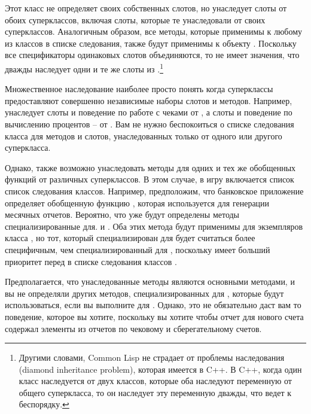 Этот класс не определяет своих собственных слотов, но унаследует слоты от обоих
суперклассов, включая слоты, которые те унаследовали от своих суперклассов.  Аналогичным
образом, все методы, которые применимы к любому из классов в списке следования, также
будут применимы к объекту .  Поскольку все спецификаторы
одинаковых слотов объединяются, то не имеет значения, что 
дважды наследует одни и те же слоты из .\footnote{Другими словами,
  Common Lisp не страдает от проблемы наследования (diamond inheritance problem), которая
  имеется в C++.  В C++, когда один класс наследуется от двух классов, которые оба
  наследуют переменную от общего суперкласса, то он наследует эту переменную дважды, что
  ведет к беспорядку.}

Множественное наследование наиболее просто понять когда суперклассы предоставляют
совершенно независимые наборы слотов и методов.  Например, 
унаследует слоты и поведение по работе с чеками от , а слоты и
поведение по вычислению процентов -- от .  Вам не нужно беспокоиться
о списке следования класса для методов и слотов, унаследованных только от одного или
другого суперкласса.

Однако, также возможно унаследовать методы для одних и тех же обобщенных функций от
различных суперклассов.  В этом случае, в игру включается список список следования
классов.  Например, предположим, что банковское приложение определяет обобщенную функцию
, которая используется для генерации месячных отчетов.  Вероятно,
что уже будут определены методы  специализированные для.
 и .  Оба этих метода будут применимы для
экземпляров класса , но тот, который специализирован для
 будет считаться более специфичным, чем специализированный для
, поскольку  имеет больший приоритет перед
 в списке следования классов .

Предполагается, что унаследованные методы являются основными методами, и вы не определяли
других методов, специализированных для , которые будут
использоваться, если вы выполните  для .
Однако, это не обязательно даст вам то поведение, которое вы хотите, поскольку вы хотите
чтобы отчет для нового счета содержал элементы из отчетов по чековому и сберегательному
счетов.

